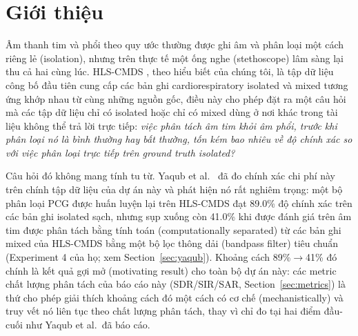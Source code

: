\documentclass[11pt]{article}
\begin{document}
\tableofcontents

\section{Giới thiệu}

Âm thanh tim và phổi theo quy ước thường được ghi âm và phân loại một cách
riêng lẻ (isolation), nhưng trên thực tế một ống nghe (stethoscope) lâm
sàng lại thu cả hai cùng lúc. HLS-CMDS \cite{hlscmds}, theo hiểu biết của
chúng tôi, là tập dữ liệu công bố đầu tiên cung cấp các bản ghi
cardiorespiratory isolated và mixed tương ứng khớp nhau từ cùng những
nguồn gốc, điều này cho phép đặt ra một câu hỏi mà các tập dữ liệu chỉ có
isolated hoặc chỉ có mixed dùng ở nơi khác trong tài liệu không thể trả
lời trực tiếp: \emph{việc phân tách âm tim khỏi âm phổi, trước khi phân
loại nó là bình thường hay bất thường, tốn kém bao nhiêu về độ chính xác
so với việc phân loại trực tiếp trên ground truth isolated?}

Câu hỏi đó không mang tính tu từ. Yaqub et al.\ \cite{spectrotemporal} đã
đo chính xác chi phí này trên chính tập dữ liệu của dự án này và phát hiện
nó rất nghiêm trọng: một bộ phân loại PCG được huấn luyện lại trên
HLS-CMDS đạt 89.0\% độ chính xác trên các bản ghi isolated sạch, nhưng sụp
xuống còn 41.0\% khi được đánh giá trên âm tim được phân tách bằng tính
toán (computationally separated) từ các bản ghi mixed của HLS-CMDS bằng
một bộ lọc thông dải (bandpass filter) tiêu chuẩn (Experiment 4 của họ;
xem Section~\ref{sec:yaqub}). Khoảng cách 89\%$\to$41\% đó chính là kết
quả gợi mở (motivating result) cho toàn bộ dự án này: các metric chất
lượng phân tách của báo cáo này (SDR/SIR/SAR, Section~\ref{sec:metrics})
là thứ cho phép giải thích khoảng cách đó một cách có cơ chế (mechanistically)
và truy vết nó liên tục theo chất lượng phân tách, thay vì chỉ đo tại hai
điểm đầu-cuối như Yaqub et al.\ đã báo cáo.
\end{document}
